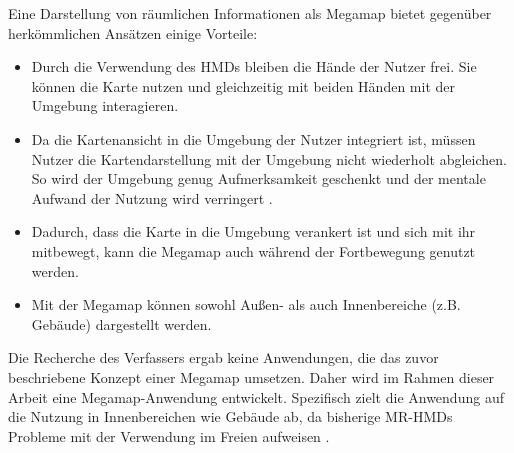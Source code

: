 %

Eine Darstellung von räumlichen Informationen als Megamap bietet gegenüber herkömmlichen Ansätzen einige Vorteile:
\begin{itemize}
    \item Durch die Verwendung des HMDs bleiben die Hände der Nutzer frei. %
    Sie können die Karte nutzen und gleichzeitig mit beiden Händen mit der Umgebung interagieren.

    \item Da die Kartenansicht in die Umgebung der Nutzer integriert ist, müssen Nutzer die Kartendarstellung mit der Umgebung nicht wiederholt abgleichen. %
    So wird der Umgebung genug Aufmerksamkeit geschenkt und der mentale Aufwand der Nutzung wird verringert \parencites[4\psq]{Bark2014}{Narzt2006}{Kim2009}.

    \item Dadurch, dass die Karte in die Umgebung verankert ist und sich mit ihr mitbewegt, kann die Megamap auch während der Fortbewegung genutzt werden.

    \item Mit der Megamap können sowohl Außen- als auch Innenbereiche (z.B. Gebäude) dargestellt werden.
\end{itemize}

Die Recherche des Verfassers ergab keine Anwendungen, die das zuvor beschriebene Konzept einer Megamap umsetzen.
Daher wird im Rahmen dieser Arbeit eine Megamap-Anwendung entwickelt.
Spezifisch zielt die Anwendung auf die Nutzung in Innenbereichen wie Gebäude ab, da bisherige MR-HMDs Probleme mit der Verwendung im Freien aufweisen \parencites{Schroeder2017}{Strange2018}.

